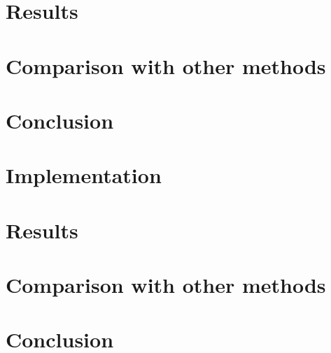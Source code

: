 \documentclass[10pt,twoside,a4paper]{article}
\begin{document}
\section{Results}\label{sec:results}
\section{Comparison with other methods}\label{sec:comparison}
\section{Conclusion}\label{sec:conclusion}
\cite{BL22}
\cite{CHF20}
\cite{KLL+19}
\cite{LRGC22}
\cite{NMBP20}
\section{Implementation}\label{sec:implementation}
\section{Results}\label{sec:results}
\section{Comparison with other methods}\label{sec:comparison}
\section{Conclusion}\label{sec:conclusion}



\end{document}

